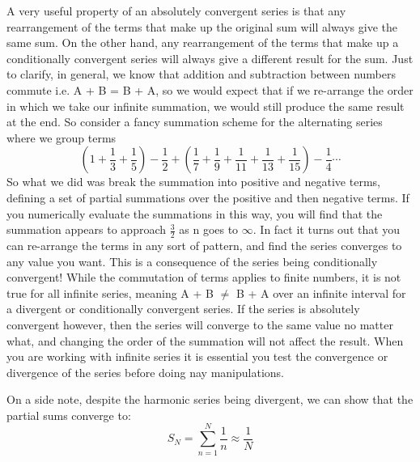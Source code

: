 \documentclass{article}
\newcommand{\be}{\begin{equation}}
\newcommand{\ee}{\end{equation}}
\begin{document}
A very useful property of an absolutely convergent series is that any rearrangement of the terms that make up the original sum will always give the same sum.
On the other hand, any rearrangement of the terms that make up a conditionally convergent series will always give a different result for the sum.
Just to clarify, in general, we know that addition and subtraction between numbers commute i.e. A + B = B + A, so we would expect that if we re-arrange the order in which we take our infinite summation, we would still produce the same result at the end.
So consider a fancy summation scheme for the alternating series where we group terms
\be
\left(1 + \frac{1}{3} + \frac{1}{5}\right) - \frac{1}{2} + \left(\frac{1}{7} + \frac{1}{9} + \frac{1}{11} + \frac{1}{13} + \frac{1}{15}\right) - \frac{1}{4} \cdots
\ee
So what we did was break the summation into positive and negative terms, defining a set of partial summations over the positive and then negative terms.
If you numerically evaluate the summations in this way, you will find that the summation appears to approach $\frac{3}{2}$ as n goes to $\infty$.
In fact it turns out that you can re-arrange the terms in any sort of pattern, and find the series converges to any value you want.
This is a consequence of the series being conditionally convergent!
While the commutation of terms applies to finite numbers, it is not true for all infinite series, meaning A + B $\neq$ B + A over an infinite interval for a divergent or conditionally convergent series.
If the series is absolutely convergent however, then the series will converge to the same value no matter what, and changing the order of the summation will not affect the result.
When you are working with infinite series it is essential you test the convergence or divergence of the series before doing nay manipulations.

On a side note, despite the harmonic series being divergent, we can show that the partial sums converge to:
\be
S_N = \sum_{n=1}^{N} \frac{1}{n} \approx \frac{1}{N}
\ee
\end{document}
